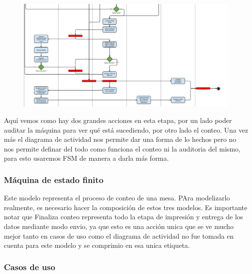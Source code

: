 \begin{figure}[h!]
\centering
\includegraphics[scale=0.45]{imagenes/actividad/actividadConteo2}
\end{figure}

Aquí vemos como hay dos grandes acciones en esta etapa, por un lado poder auditar la máquina para ver qu\'e est\'a sucediendo, por otro lado el conteo. Una vez más el diagrama de actividad nos permite dar una forma de lo hechos pero no nos permite definar del todo como funciona el conteo ni la auditoria del mismo, para esto usaremos FSM de manera a darla más forma.

\newpage

\subsubsection{Máquina de estado finito}


Este modelo representa el proceso de conteo de una mesa. PAra modelizarlo realmente, es necesario hacer la composición de estos tres modelos. Es importante notar que Finaliza conteo representa todo la etapa de impresión y entrega de los datos mediante modo envio, ya que esto es una acción unica que se ve mucho mejor tanto en casos de uso como el diagrama de actividad no fue tomada en cuenta para este modelo y se comprimio en esa unica etiqueta.


\newpage

\subsubsection{Casos de uso}

